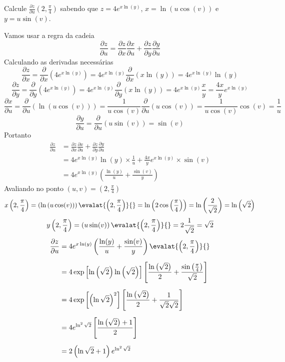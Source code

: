 \documentclass[a4paper,12pt,fleqn]{article}
\newcommand{\D}[2]{\frac{\partial {#1}}{\partial {#2}}}
\begin{document}
\clearpage


Calcule \(\D{z}{u}\left(2, \frac{\pi}{4}\right)\) sabendo que
\(
  z = 4e^{x\ln(y)}
\),
\(
  x = \ln\left(u\cos(v)\right)
\)
e
\(
  y = u \sin(v)
\).

\begin{answer}
  Vamos usar a regra da cadeia
  \[
    \D{z}{u} = \D{z}{x}\D{x}{u} + \D{z}{y}\D{y}{u}
  \]
  Calculando as derivadas necessárias
  \[
    \D{z}{x}
    = \D{}{x}\left(4e^{x\ln(y)}\right)
    = 4e^{x\ln(y)} \D{}{x}\left(x\ln(y)\right)
    = 4e^{x\ln(y)} \ln(y)
  \]
  \[
    \D{z}{y}
    = \D{}{y}\left(4e^{x\ln(y)}\right)
    = 4e^{x\ln(y)} \D{}{y}\left(x\ln(y)\right)
    = 4e^{x\ln(y)} \frac{x}{y}
    = \frac{4x}{y}e^{x\ln(y)}
  \]
  \[
    \D{x}{u}
    = \D{}{u}\left(\ln\left(u\cos(v)\right)\right)
    = \frac{1}{u\cos(v)}\D{}{u}\left(u\cos(v)\right)
    = \frac{1}{u\cos(v)}\cos(v)
    = \frac{1}{u}
  \]
  \[
    \D{y}{u}
    = \D{}{u}\left(u \sin(v)\right)
    = \sin(v)
  \]
  Portanto
  \begin{align*}
    \D{z}{u}
    & = \D{z}{x}\D{x}{u} + \D{z}{y}\D{y}{u} \\[2mm]
    & = 4e^{x\ln(y)} \ln(y) \times \frac{1}{u}
      + \frac{4x}{y}e^{x\ln(y)} \times \sin(v) \\[2mm]
    & = 4e^{x\ln(y)}\left(\frac{\ln(y)}{u} + \frac{\sin(v)}{y}\right)
  \end{align*}
  Avaliando no ponto \((u, v) = \left(2, \frac{\pi}{4}\right)\)
  \[
    x\left(2, \frac{\pi}{4}\right)
    = \left(\ln\left(u\cos(v)\right)\right)\evalat{\left(2, \frac{\pi}{4}\right)}{}
    = \ln\left(2\cos\left(\frac{\pi}{4}\right)\right)
    = \ln\left(\frac{2}{\sqrt{2}}\right)
    = \ln\left(\sqrt{2}\right)
  \]
  \[
    y\left(2, \frac{\pi}{4}\right)
    = \left(u \sin(v)\right)\evalat{\left(2, \frac{\pi}{4}\right)}{}
    = 2 \frac{1}{\sqrt{2}}
    = \sqrt{2}
  \]
  \begin{align*}
    \D{z}{u}
    & = 4 e^{x\ln(y)}
        \left(\frac{\ln(y)}{u} + \frac{\sin(v)}{y}
        \right)\evalat{\left(2, \frac{\pi}{4}\right)}{} \\[2mm]
    & = 4 \exp\left[\ln\left(\sqrt{2}\right) \ln\left(\sqrt{2}\right)\right]
        \left[\frac{\ln\left(\sqrt{2}\right)}{2} + \frac{\sin\left(\frac{\pi}{4}\right)}{\sqrt{2}}
        \right] \\[2mm]
    & = 4 \exp\left[\left(\ln\sqrt{2}\right)^2\right]
    \left[\frac{\ln\left(\sqrt{2}\right)}{2} + \frac{1}{\sqrt{2}\sqrt{2}}\right] \\[2mm]
    & = 4 e^{\ln^2\sqrt{2}}
    \left[\frac{\ln\left(\sqrt{2}\right)+1}{2}\right] \\[2mm]
    & = 2 \left(\ln\sqrt{2}+1\right)e^{\ln^2\sqrt{2}}
  \end{align*}
  \clearpage
\end{answer}
\end{document}
